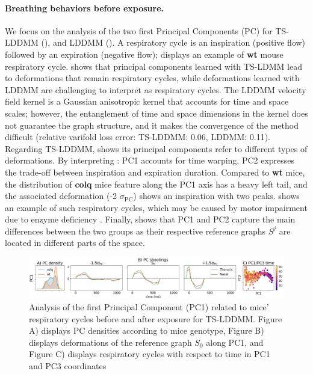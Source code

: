     \vspace{-1ex}
\paragraph{Breathing behaviors before exposure.}
 We focus on the analysis of the two first Principal Components (PC) for TS-LDDMM (), and LDDMM ().
  A respiratory cycle is an inspiration (positive flow) followed by an expiration (negative flow);  displays an example of \textbf{wt} mouse respiratory cycle.
    shows that principal components learned with TS-LDMM lead to deformations that remain respiratory cycles, while deformations learned with LDDMM are challenging to interpret as respiratory cycles.
   The LDDMM velocity field kernel is a Gaussian anisotropic kernel that accounts for time and space scales; however, the entanglement of time and space dimensions in the kernel does not guarantee the graph structure, and it makes the convergence of the method difficult (relative varifold loss error: TS-LDDMM: 0.06, LDDMM: 0.11).
    Regarding TS-LDDMM,  shows its principal components refer to different types of deformations.
     By interpreting : PC1 accounts for time warping, PC2 expresses the trade-off between inspiration and expiration duration.
      Compared to \textbf{wt} mice, the distribution of \textbf{colq} mice feature along the PC1 axis has a heavy left tail, and the associated deformation (-2 $\sigma_{\text{PC}}$) shows an inspiration with two peaks.
        shows an example of such respiratory cycles, which may be caused by motor impairment due to enzyme deficiency \cite{germain2023unsupervised}.
        Finally,  shows that PC1 and PC2 capture the main differences between the two groups as their respective reference graphs $S^j$ are located in different parts of the space. 

\begin{figure}[t]
  \centering
  \includegraphics[width=0.95\linewidth]{"./pictures/exp2.pdf"}
  \caption{Analysis of the first Principal Component (PC1) related to mice' respiratory cycles before and after exposure for TS-LDDMM. Figure A) displays PC densities according to mice genotype, Figure B) displays  deformations of the reference graph $S_0$ along PC1, and Figure C) displays respiratory cycles with respect to time in PC1 and PC3 coordinates}
  \label{fig:exp_2_PCA}
  \vspace{-1.5em}
\end{figure}
\vspace{-1ex}
